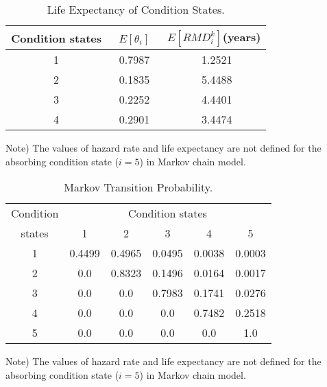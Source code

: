 \begin{table}[t]
\caption{Life Expectancy of Condition States.}
\label{table63}
\begin{center}
{\small
\begin{tabular}{c|cc}\hline
   Condition states& ~$E[\theta_{i}]$~& $E[RMD_{i}^k]$(years) \\\hline
  1 & ~0.7987~ & ~1.2521  \\
   2 & ~0.1835~ & ~5.4488  \\
   3 & ~0.2252~ & ~4.4401 \\
   4 & ~0.2901~ & ~3.4474 \\
   \hline
\end{tabular}
}
\end{center}
\footnotesize Note) The values of hazard rate and life expectancy are not defined for the  absorbing condition state ($i=5$) in Markov chain model.
\end{table}

\begin{table}[t]
\caption{Markov Transition Probability.}
\label{table64}
\begin{center}
{\small
\begin{tabular}{l|lllll}
\hline
\multicolumn{1}{c|}{Condition} & \multicolumn{5}{c}{Condition states} \\ 
\multicolumn{1}{c|}{states} & \multicolumn{1}{c}{1} & \multicolumn{1}{c}{2} & \multicolumn{1}{c}{3} & \multicolumn{1}{c}{4} & \multicolumn{1}{c}{5} \\ 
\hline
\multicolumn{1}{c|}{1} & \multicolumn{1}{c}{0.4499} & \multicolumn{1}{c}{0.4965} & \multicolumn{1}{c}{0.0495} & \multicolumn{1}{c}{0.0038} & \multicolumn{1}{c}{0.0003} \\ 
\multicolumn{1}{c|}{2} & \multicolumn{1}{c}{0.0} & \multicolumn{1}{c}{0.8323} & \multicolumn{1}{c}{0.1496} & \multicolumn{1}{c}{0.0164} & \multicolumn{1}{c}{0.0017} \\ 
\multicolumn{1}{c|}{3} & \multicolumn{1}{c}{0.0} & \multicolumn{1}{c}{0.0} & \multicolumn{1}{c}{0.7983} & \multicolumn{1}{c}{0.1741} & \multicolumn{1}{c}{0.0276} \\ 
\multicolumn{1}{c|}{4} & \multicolumn{1}{c}{0.0} & \multicolumn{1}{c}{0.0} & \multicolumn{1}{c}{0.0} & \multicolumn{1}{c}{0.7482} & \multicolumn{1}{c}{0.2518} \\ 
\multicolumn{1}{c|}{5} & \multicolumn{1}{c}{0.0} & \multicolumn{1}{c}{0.0} & \multicolumn{1}{c}{0.0} & \multicolumn{1}{c}{0.0} & \multicolumn{1}{c}{1.0} \\ 
\hline
\end{tabular}
}
\end{center}
\footnotesize Note) The values of hazard rate and life expectancy are not defined for the  absorbing condition state ($i=5$) in Markov chain model.
\end{table}

